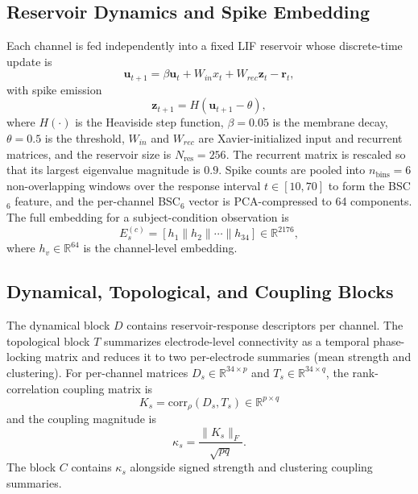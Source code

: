 \documentclass[journal]{IEEEtran}
\begin{document}
\subsection{Reservoir Dynamics and Spike Embedding}
Each channel is fed independently into a fixed LIF reservoir whose discrete-time update is
\begin{equation}
\mathbf{u}_{t+1}=\beta\mathbf{u}_{t}+W_{in}x_t+W_{rec}\mathbf{z}_t-\mathbf{r}_t,
\label{eq:lif}
\end{equation}
with spike emission
\begin{equation}
\mathbf{z}_{t+1}=H(\mathbf{u}_{t+1}-\theta),
\label{eq:spike}
\end{equation}
where $H(\cdot)$ is the Heaviside step function, $\beta=0.05$ is the membrane decay, $\theta=0.5$ is the threshold, $W_{in}$ and $W_{rec}$ are Xavier-initialized input and recurrent matrices, and the reservoir size is $N_{\text{res}}=256$. The recurrent matrix is rescaled so that its largest eigenvalue magnitude is $0.9$. Spike counts are pooled into $n_{\text{bins}}=6$ non-overlapping windows over the response interval $t\in[10,70]$ to form the BSC$_6$ feature, and the per-channel BSC$_6$ vector is PCA-compressed to 64 components. The full embedding for a subject-condition observation is
\begin{equation}
E_s^{(c)}=\left[h_1\|h_2\|\cdots\|h_{34}\right]\in\mathbb{R}^{2176},
\label{eq:E}
\end{equation}
where $h_v\in\mathbb{R}^{64}$ is the channel-level embedding.

\subsection{Dynamical, Topological, and Coupling Blocks}
The dynamical block $D$ contains reservoir-response descriptors per channel. The topological block $T$ summarizes electrode-level connectivity as a temporal phase-locking matrix and reduces it to two per-electrode summaries (mean strength and clustering). For per-channel matrices $D_s\in\mathbb{R}^{34\times p}$ and $T_s\in\mathbb{R}^{34\times q}$, the rank-correlation coupling matrix is
\begin{equation}
K_s = \mathrm{corr}_{\rho}(D_s,T_s) \in \mathbb{R}^{p\times q}
\end{equation}
and the coupling magnitude is
\begin{equation}
\kappa_s = \frac{\|K_s\|_F}{\sqrt{pq}}.
\label{eq:kappa}
\end{equation}
The block $C$ contains $\kappa_s$ alongside signed strength and clustering coupling summaries.
\end{document}
